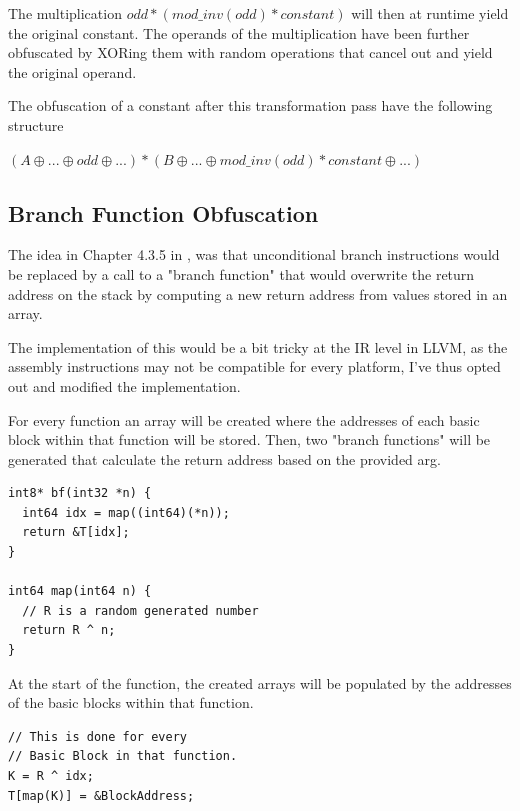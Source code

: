 The multiplication $ odd * (mod\_inv(odd) * constant)$ will then at runtime yield the original constant. The operands of
the multiplication have been further obfuscated by XORing them with random operations that cancel out and yield the original operand.

The obfuscation of a constant after this transformation pass have the following structure

$(A \oplus ... \oplus odd \oplus ...) * (B \oplus ... \oplus mod\_inv(odd) * constant \oplus ...)$

\subsection{Branch Function Obfuscation}

The idea in Chapter 4.3.5 in \cite{ss-chpt4}, was that unconditional branch instructions would be replaced by a call to a
"branch function" that would overwrite the return address on the stack by computing a new return address from values stored in an array.

The implementation of this would be a bit tricky at the IR level in LLVM, as the assembly instructions may not be compatible for every platform,
I've thus opted out and modified the implementation.

For every function an array will be created where the addresses of each basic block within that function will be stored.
Then, two "branch functions" will be generated that calculate the return address based on the provided arg.

\lstset{language=C++} %
\lstset{basicstyle=\ttfamily} %
\begin{lstlisting}
int8* bf(int32 *n) {
  int64 idx = map((int64)(*n));
  return &T[idx];
}

int64 map(int64 n) {
  // R is a random generated number
  return R ^ n;
}

\end{lstlisting}

At the start of the function, the created arrays will be populated by the addresses
of the basic blocks within that function.

\lstset{language=C++} %
\lstset{basicstyle=\ttfamily} %
\begin{lstlisting}
// This is done for every
// Basic Block in that function.
K = R ^ idx;
T[map(K)] = &BlockAddress;
\end{lstlisting}

